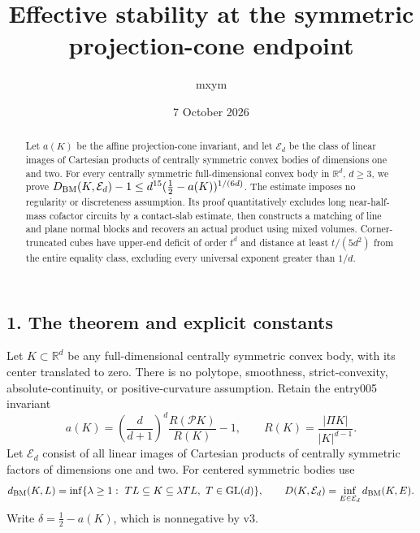 \documentclass[
  11pt,
]{article}
\title{Effective stability at the symmetric projection-cone endpoint}
\author{mxym}
\date{7 October 2026}
\begin{document}
\maketitle
\begin{abstract}
Let \(a(K)\) be the affine projection-cone invariant, and let
\(\mathcal E_d\) be the class of linear images of Cartesian products of
centrally symmetric convex bodies of dimensions one and two. For every
centrally symmetric full-dimensional convex body in \(\mathbb R^d\),
\(d\ge3\), we prove
\(D_{\rm BM}(K,\mathcal E_d)-1\le d^{15}(\tfrac12-a(K))^{1/(6d)}\). The
estimate imposes no regularity or discreteness assumption. Its proof
quantitatively excludes long near-half-mass cofactor circuits by a
contact-slab estimate, then constructs a matching of line and plane
normal blocks and recovers an actual product using mixed volumes.
Corner-truncated cubes have upper-end deficit of order \(t^d\) and
distance at least \(t/(5d^2)\) from the entire equality class, excluding
every universal exponent greater than \(1/d\).
\end{abstract}

\subsection{1. The theorem and explicit
constants}\label{the-theorem-and-explicit-constants}

Let \(K\subset\mathbb R^d\) be any full-dimensional centrally symmetric
convex body, with its center translated to zero. There is no polytope,
smoothness, strict-convexity, absolute-continuity, or positive-curvature
assumption. Retain the entry005 invariant \[
 a(K)=\left(\frac d{d+1}\right)^d\frac{R(\mathcal P K)}{R(K)}-1,
 \qquad R(K)=\frac{|\Pi K|}{|K|^{d-1}}.
\] Let \(\mathcal E_d\) consist of all linear images of Cartesian
products of centrally symmetric factors of dimensions one and two. For
centered symmetric bodies use \[
 d_{\rm BM}(K,L)=\inf\{\lambda\ge1:\ TL\subseteq K\subseteq\lambda TL,
                  \ T\in\mathrm{GL}(d)\},
 \qquad D(K,\mathcal E_d)=\inf_{E\in\mathcal E_d}d_{\rm BM}(K,E).
\] Write \(\delta=\tfrac12-a(K)\), which is nonnegative by v3.
\end{document}
